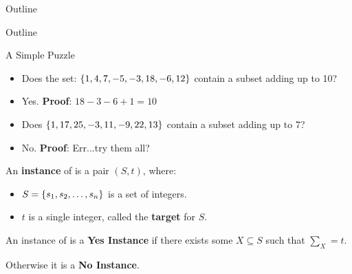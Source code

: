 \documentclass[c]{beamer}
\begin{document}
\begin{frame}{Outline}
  \begin{center}
    \scaletopagewidth{\outlinealmostfinal}
  \end{center}
\end{frame}

\begin{frame}{Outline}
  \begin{center}
    \scaletopagewidth{\outlinefinal}
  \end{center}
\end{frame}

\begin{frame}{A Simple Puzzle}
  
  \begin{itemize}
  \item[] Does the set: $\{1,4,7,-5,-3,18,-6,12\}$ contain
    a subset adding up to 10? \pause
  \item[] Yes.  \textbf{Proof}: $18 - 3 - 6 + 1 = 10$ \pause
  \item[] Does $\{1, 17, 25, -3, 11, -9, 22, 13\}$ contain a subset
    adding up to 7?\pause
  \item[] No.  \textbf{Proof}: Err...try them all? 
  \end{itemize}
  
\end{frame}

\begin{frame}{\subsum{}}

  An \textbf{instance} of \subsum{} is a pair $(S, t)$, where:

    \begin{itemize}
    \item $S = \{s_1, s_2, \ldots, s_n\}$ is a set of integers.
    \item $t$ is a single integer, called the \textbf{target} for $S$.
    \end{itemize}\pause

    \vspace{\baselineskip}

    An instance of \subsum{} is a \textbf{Yes Instance} if
    there exists some $X \subseteq S$ such that $\sum_X = t$.

    \vspace{\baselineskip}
    
    Otherwise it is a \textbf{No Instance}.
\end{frame}
\end{document}
